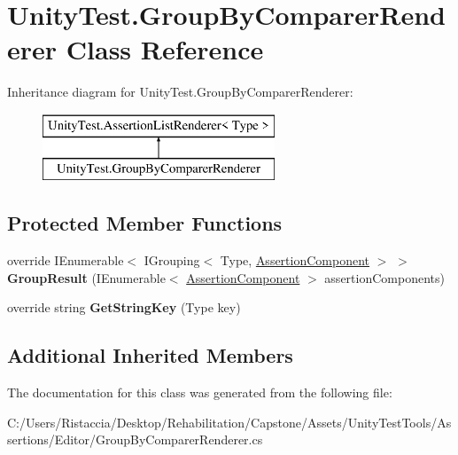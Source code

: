 \hypertarget{class_unity_test_1_1_group_by_comparer_renderer}{}\section{Unity\+Test.\+Group\+By\+Comparer\+Renderer Class Reference}
\label{class_unity_test_1_1_group_by_comparer_renderer}
Inheritance diagram for Unity\+Test.\+Group\+By\+Comparer\+Renderer\+:\begin{figure}[H]
\begin{center}
\leavevmode
\includegraphics[height=2.000000cm]{class_unity_test_1_1_group_by_comparer_renderer}
\end{center}
\end{figure}
\subsection*{Protected Member Functions}
\begin{DoxyCompactItemize}
\item 
\mbox{\label{class_unity_test_1_1_group_by_comparer_renderer_a1a1295f2a7c63633ada3a60e55ceb63f}} 
override I\+Enumerable$<$ I\+Grouping$<$ Type, \hyperlink{class_unity_test_1_1_assertion_component}{Assertion\+Component} $>$ $>$ {\bfseries Group\+Result} (I\+Enumerable$<$ \hyperlink{class_unity_test_1_1_assertion_component}{Assertion\+Component} $>$ assertion\+Components)
\item 
\mbox{\label{class_unity_test_1_1_group_by_comparer_renderer_a44c727e6326a6a6f8d2a73f80446caae}} 
override string {\bfseries Get\+String\+Key} (Type key)
\end{DoxyCompactItemize}
\subsection*{Additional Inherited Members}


The documentation for this class was generated from the following file\+:\begin{DoxyCompactItemize}
\item 
C\+:/\+Users/\+Ristaccia/\+Desktop/\+Rehabilitation/\+Capstone/\+Assets/\+Unity\+Test\+Tools/\+Assertions/\+Editor/Group\+By\+Comparer\+Renderer.\+cs\end{DoxyCompactItemize}
